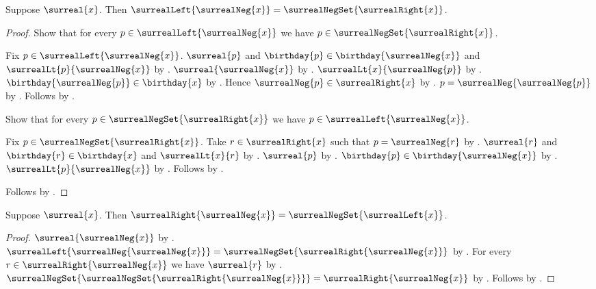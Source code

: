 \begin{theorem}\label{surreal_left_negation}
    Suppose $\surreal{x}$.
    Then $\surrealLeft{\surrealNeg{x}}=
        \surrealNegSet{\surrealRight{x}}$.
\end{theorem}
\begin{proof}
    Show that for every $p\in\surrealLeft{\surrealNeg{x}}$ we have
        $p\in\surrealNegSet{\surrealRight{x}}$.
    \begin{subproof}
        Fix $p\in\surrealLeft{\surrealNeg{x}}$.
        $\surreal{p}$ and
            $\birthday{p}\in\birthday{\surrealNeg{x}}$ and
            $\surrealLt{p}{\surrealNeg{x}}$
            by .
        $\surreal{\surrealNeg{x}}$
            by .
        $\surrealLt{x}{\surrealNeg{p}}$
            by .
        $\birthday{\surrealNeg{p}}\in\birthday{x}$
            by .
        Hence $\surrealNeg{p}\in\surrealRight{x}$
            by .
        $p=\surrealNeg{\surrealNeg{p}}$
            by .
        Follows by .
    \end{subproof}
    Show that for every $p\in\surrealNegSet{\surrealRight{x}}$ we have
        $p\in\surrealLeft{\surrealNeg{x}}$.
    \begin{subproof}
        Fix $p\in\surrealNegSet{\surrealRight{x}}$.
        Take $r\in\surrealRight{x}$ such that $p=\surrealNeg{r}$
            by .
        $\surreal{r}$ and $\birthday{r}\in\birthday{x}$ and
            $\surrealLt{x}{r}$
            by .
        $\surreal{p}$ by .
        $\birthday{p}\in\birthday{\surrealNeg{x}}$
            by .
        $\surrealLt{p}{\surrealNeg{x}}$
            by .
        Follows by .
    \end{subproof}
    Follows by .
\end{proof}

\begin{theorem}\label{surreal_right_negation}
    Suppose $\surreal{x}$.
    Then $\surrealRight{\surrealNeg{x}}=
        \surrealNegSet{\surrealLeft{x}}$.
\end{theorem}
\begin{proof}
    $\surreal{\surrealNeg{x}}$
        by .
    $\surrealLeft{\surrealNeg{\surrealNeg{x}}}
        =\surrealNegSet{\surrealRight{\surrealNeg{x}}}$
        by .
    For every $r\in\surrealRight{\surrealNeg{x}}$ we have $\surreal{r}$
        by .
    $\surrealNegSet{\surrealNegSet{\surrealRight{\surrealNeg{x}}}}
        =\surrealRight{\surrealNeg{x}}$
        by .
    Follows by .
\end{proof}

